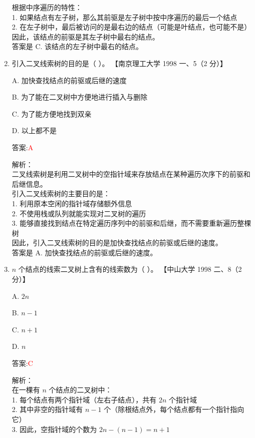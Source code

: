\documentclass[lang=cn,newtx,10pt,scheme=chinese]{../../../elegantbook}
\begin{document}
\begin{enumerate}
    根据中序遍历的特性：\\
    1. 如果结点有左子树，那么其前驱是左子树中按中序遍历的最后一个结点\\
    2. 在左子树中，最后被访问的是最右边的结点（可能是叶结点，也可能不是）\\
    
    因此，该结点的前驱是其左子树中最右的结点。\\
    
    答案是 C. 该结点的左子树中最右的结点。\\  

    \item 引入二叉线索树的目的是（ ）。  
    【南京理工大学 1998 一、5（2 分）】

    A. 加快查找结点的前驱或后继的速度  

    B. 为了能在二叉树中方便地进行插入与删除  

    C. 为了能方便地找到双亲  

    D. 以上都不是  

    答案:\textcolor{red}{A}
    
    解析：\\
    二叉线索树是利用二叉树中的空指针域来存放结点在某种遍历次序下的前驱和后继信息。\\
    
    引入二叉线索树的主要目的是：\\
    1. 利用原本空闲的指针域存储额外信息\\
    2. 不使用栈或队列就能实现对二叉树的遍历\\
    3. 能够直接找到结点在特定遍历序列中的前驱和后继，而不需要重新遍历整棵树\\
    
    因此，引入二叉线索树的目的是加快查找结点的前驱或后继的速度。\\
    
    答案是 A. 加快查找结点的前驱或后继的速度。\\  

    \item $n$ 个结点的线索二叉树上含有的线索数为（ ）。  
    【中山大学 1998 二、8（2 分）】  

    A. $2n$  

    B. $n - 1$  

    C. $n+1$  

    D. $n$  

    答案:\textcolor{red}{C}
    
    解析：\\
    在一棵有 $n$ 个结点的二叉树中：\\
    1. 每个结点有两个指针域（左右子结点），共有 $2n$ 个指针域\\
    2. 其中非空的指针域有 $n-1$ 个（除根结点外，每个结点都有一个指针指向它）\\
    3. 因此，空指针域的个数为 $2n-(n-1)=n+1$\\
    

\end{enumerate}
\end{document}
